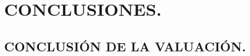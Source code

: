 \espacio{7cm}
\chapter{CONCLUSIONES.}\label{cap:6}
\thispagestyle{fancy}
\setcounter{section}{16}
\section{CONCLUSI\'ON DE LA VALUACI\'ON.}\label{sec:p}
